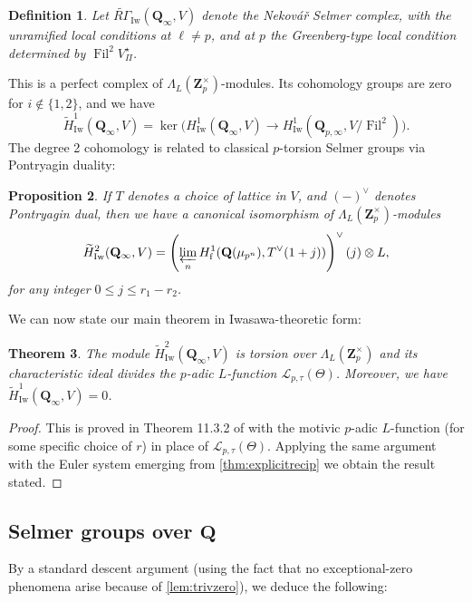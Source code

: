 \documentclass[cjm]{ipart}
\theoremstyle{plain}
\newtheorem{theorem}{Theorem}[subsection]
\newtheorem{proposition}[theorem]{Proposition}
\newtheorem{definition}[theorem]{Definition}
\theoremstyle{remark}
\DeclareMathOperator{\Fil}{Fil}
\DeclareMathOperator{\Iw}{Iw}
\newcommand{\Nek}{Nekov\'a\v{r}\xspace}
\newcommand{\QQ}{\mathbf{Q}}
\newcommand{\RGt}{\widetilde{R\Gamma}}
\newcommand{\Zp}{\mathbf{Z}_p}
\newcommand{\cL}{\mathcal{L}}
\newcommand{\wH}{\widetilde{H}}
\numberwithin{equation}{subsection}
\renewcommand{\le}{\leqslant}
\begin{document}
  \begin{definition}
   Let $\RGt_{\Iw}(\QQ_\infty, V)$ denote the \Nek Selmer complex, with the unramified local conditions at $\ell \ne p$, and at $p$ the Greenberg-type local condition determined by $\Fil^2 V_{\Pi}^\star$.
  \end{definition}

  This is a perfect complex of $\Lambda_L(\Zp^\times)$-modules. Its cohomology groups are zero for $i \notin \{1, 2\}$, and we have
  \[
   \wH^1_{\Iw}(\QQ_\infty, V) = \ker\Big( H^1_{\Iw}(\QQ_\infty, V) \to H^1_{\Iw}\left(\QQ_{p, \infty}, V / \Fil^2\right)\Big).
  \]
  The degree 2 cohomology is related to classical $p$-torsion Selmer groups via Pontryagin duality:

  \begin{proposition}
   \label{prop:nekovarduality}
   If $T$ denotes a choice of lattice in $V$, and $(-)^\vee$ denotes Pontryagin dual, then we have a canonical isomorphism of $\Lambda_L(\Zp^\times)$-modules
   \[ \wH^2_{\Iw}(\QQ_\infty, V) = \left(\varprojlim_n H^1_{\mathrm{f}}(\QQ(\mu_{p^n}), T^\vee(1+j))\right)^\vee(j) \otimes L,\]
   for any integer $0 \le j \le r_1 - r_2$.
  \end{proposition}

  We can now state our main theorem in Iwasawa-theoretic form:

  \begin{theorem}
   The module $\wH^2_{\Iw}(\QQ_\infty, V)$ is torsion over $\Lambda_L(\Zp^\times)$ and its characteristic ideal divides the $p$-adic $L$-function $\cL_{p, \tau}(\Theta)$. Moreover, we have $ \wH^1_{\Iw}(\QQ_\infty, V) = 0$.
  \end{theorem}

  \begin{proof}
   This is proved in Theorem 11.3.2 of \cite{LSZ17} with the motivic $p$-adic $L$-function (for some specific choice of $r$) in place of $\cL_{p, \tau}(\Theta)$. Applying the same argument with the Euler system emerging from \cref{thm:explicitrecip} we obtain the result stated.
  \end{proof}


 \subsection{Selmer groups over $\QQ$}

  By a standard descent argument (using the fact that no exceptional-zero phenomena arise because of \cref{lem:trivzero}), we deduce the following:
\end{document}
